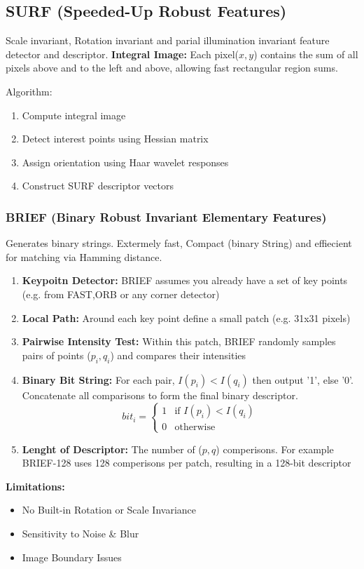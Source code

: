 \subsection{SURF (Speeded-Up Robust Features)}
Scale invariant, Rotation invariant and parial illumination invariant feature detector and descriptor.
\textbf{Integral Image:} Each pixel(\(x,y\)) contains the sum of all pixels above and to the left and above, allowing fast rectangular region sums.

Algorithm:
\begin{enumerate}
    \item Compute integral image
    \item Detect interest points using Hessian matrix
    \item Assign orientation using Haar wavelet responses
    \item Construct SURF descriptor vectors
\end{enumerate}

\subsubsection{BRIEF (Binary Robust Invariant Elementary Features)}
Generates binary strings. Extermely fast, Compact (binary String) and effiecient for matching via Hamming distance.
\begin{enumerate}
    \item \textbf{Keypoitn Detector:} BRIEF assumes you already have a set of key points (e.g. from FAST,ORB or any corner detector)
    \item \textbf{Local Path:} Around each key point define a small patch (e.g. 31x31 pixels)
    \item \textbf{Pairwise Intensity Test:} Within this patch, BRIEF randomly samples pairs of points (\(p_i,q_i\)) and compares their intensities
    \item \textbf{Binary Bit String:} For each pair, \(I(p_i)<I(q_i)\) then output '1', else '0'. Concatenate all comparisons to form the final binary descriptor.
    \[
    bit_i = 
    \begin{cases}
    1 & \text{if } I(p_i) < I(q_i) \\
    0 & \text{otherwise}
    \end{cases}
    \]
    \item \textbf{Lenght of Descriptor:} The number of (\(p,q\)) comperisons. For example BRIEF-128 uses 128 comperisons per patch, resulting in a 128-bit descriptor
\end{enumerate}
\textbf{Limitations:}
\begin{itemize}
    \item No Built-in Rotation or Scale Invariance
    \item Sensitivity to Noise \& Blur
    \item Image Boundary Issues
\end{itemize}

